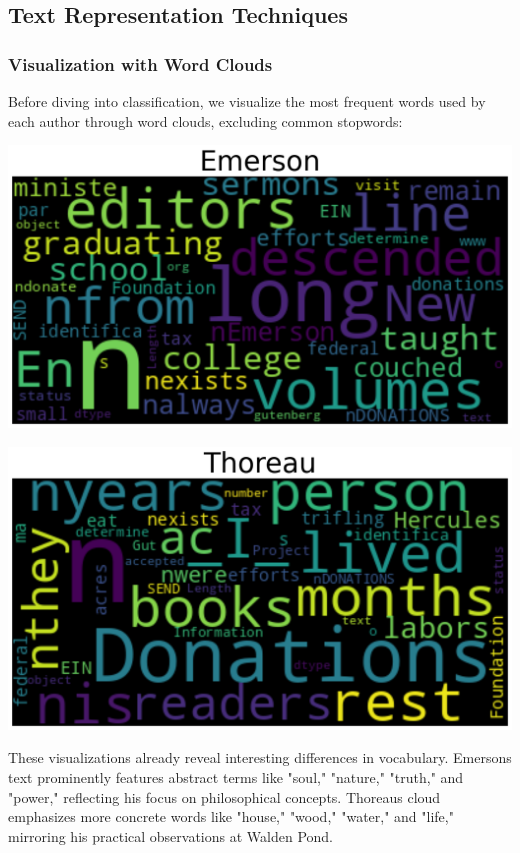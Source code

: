\documentclass[
]{article}
\begin{document}
\subsection{Text Representation
Techniques}\label{text-representation-techniques}

\subsubsection{Visualization with Word
Clouds}\label{visualization-with-word-clouds}

Before diving into classification, we visualize the most frequent words
used by each author through word clouds, excluding common stopwords:

\includegraphics{emerson_word_cloud.png}

\includegraphics{thoreau_word_cloud.png}

These visualizations already reveal interesting differences in
vocabulary. Emerson\textquotesingle s text prominently features abstract
terms like "soul," "nature," "truth," and "power," reflecting his focus
on philosophical concepts. Thoreau\textquotesingle s cloud emphasizes
more concrete words like "house," "wood," "water," and "life," mirroring
his practical observations at Walden Pond.
\end{document}
